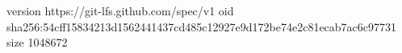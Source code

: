 version https://git-lfs.github.com/spec/v1
oid sha256:54cff15834213d1562441437cd485c12927e9d172be74e2c81ecab7ac6c97731
size 1048672
